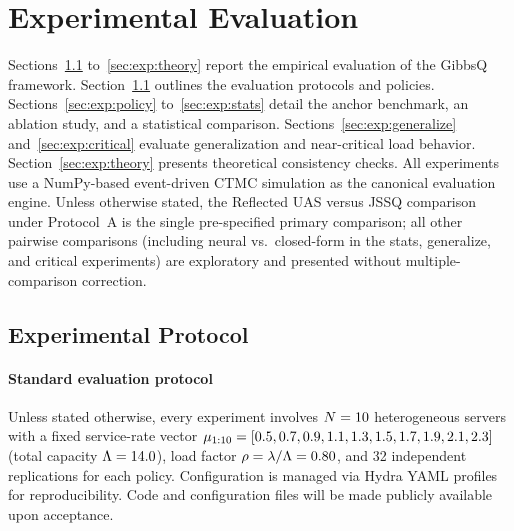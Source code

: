 
\section{Experimental Evaluation}
\label{sec:experiments}

Sections~\ref{sec:exp:setup} to~\ref{sec:exp:theory} report the empirical evaluation of the GibbsQ framework.
Section~\ref{sec:exp:setup} outlines the evaluation protocols and policies.
Sections~\ref{sec:exp:policy} to~\ref{sec:exp:stats} detail the anchor benchmark, an ablation study, and a statistical comparison.
Sections~\ref{sec:exp:generalize} and~\ref{sec:exp:critical} evaluate generalization and near-critical load behavior.
Section~\ref{sec:exp:theory} presents theoretical consistency checks.
All experiments use a NumPy-based event-driven CTMC simulation as the canonical evaluation engine.
Unless otherwise stated, the Reflected UAS versus JSSQ comparison under Protocol~A is the single pre-specified primary comparison; all other pairwise comparisons (including neural vs.\ closed-form in the stats, generalize, and critical experiments) are exploratory and presented without multiple-comparison correction.

\subsection{Experimental Protocol}
\label{sec:exp:setup}

\paragraph{Standard evaluation protocol}
Unless stated otherwise, every experiment involves $N = 10$ heterogeneous servers with a fixed service-rate vector $\mu_{1:10} = [0.5, 0.7, 0.9, 1.1, 1.3, 1.5, 1.7, 1.9, 2.1, 2.3]$ (total capacity $\Lambda = 14.0$), load factor $\rho = \lambda/\Lambda = 0.80$, and 32 independent replications for each policy.
Configuration is managed via Hydra YAML profiles for reproducibility. Code and configuration files will be made publicly available upon acceptance.

